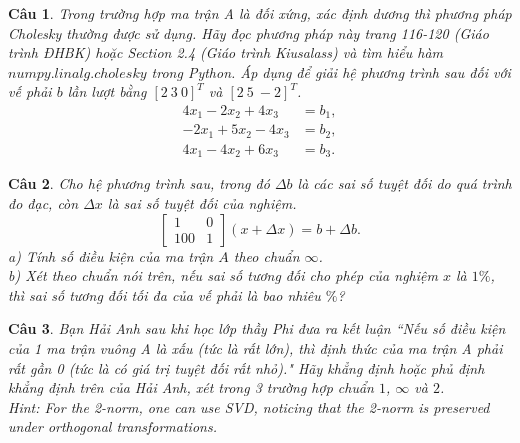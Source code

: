 \documentclass[11pt]{article}
\newtheorem{bt}{Câu}
\newcommand{\m}[1]{\begin{bmatrix}
		#1
\end{bmatrix}}
\begin{document}
\begin{bt}
Trong trường hợp ma trận A là đối xứng, xác định dương thì phương pháp Cholesky thường được sử dụng. Hãy đọc phương pháp này trang 116-120 (Giáo trình ĐHBK) hoặc Section 2.4 (Giáo trình Kiusalass) và tìm hiểu hàm $numpy.linalg.cholesky$ trong Python. Áp dụng để giải hệ phương trình sau đối với vế phải $b$ lần lượt bằng $[2 \ 3 \ 0]^T$ và $[2 \ 5 \ -2]^T$.
	\begin{align*}
	4 x_1 - 2 x_2 + 4 x_3   &= b_1, \\
	-2 x_1 + 5 x_2 - 4 x_3  &= b_2, \\
	4 x_1  -4 x_2 + 6 x_3   &= b_3. 
	\end{align*}
\end{bt}

\begin{bt}
Cho hệ phương trình sau, trong đó $\Delta b$ là các sai số tuyệt đối do quá trình đo đạc, còn $\Delta x$ là sai số tuyệt đối của nghiệm.
%
\[
\m{1 & 0 \\ 100 & 1} (x+\Delta x) = b+\Delta b.
\]
%
a) Tính số điều kiện của ma trận $A$ theo chuẩn $\infty$. \\
b) Xét theo chuẩn nói trên, nếu sai số tương đối cho phép của nghiệm $x$ là $1\%$, thì sai số tương đối tối đa của vế phải là bao nhiêu $\%$?
\end{bt}

\begin{bt}
Bạn Hải Anh sau khi học lớp thầy Phi đưa ra kết luận ``Nếu số điều kiện của 1 ma trận vuông A là xấu (tức là rất lớn), thì định thức của ma trận A phải rất gần 0 (tức là có giá trị tuyệt đối rất nhỏ)." 
Hãy khẳng định hoặc phủ định khẳng định trên của Hải Anh, xét trong 3 trường hợp chuẩn $1$, $\infty$ và $2$. \\
Hint: For the 2-norm, one can use SVD, noticing that the 2-norm is preserved under orthogonal transformations.
\end{bt}





\end{document}
